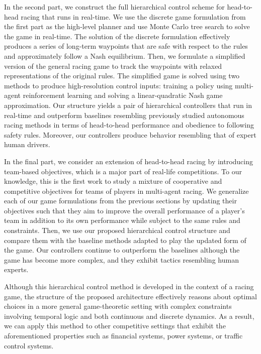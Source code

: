 In the second part, we construct the full hierarchical control scheme for head-to-head racing that runs in real-time. We use the discrete game formulation from the first part as the high-level planner and use Monte Carlo tree search to solve the game in real-time. The solution of the discrete formulation effectively produces a series of long-term waypoints that are safe with respect to the rules and approximately follow a Nash equilibrium. Then, we formulate a simplified version of the general racing game to track the waypoints with relaxed representations of the original rules. The simplified game is solved using two methods to produce high-resolution control inputs: training a policy using multi-agent reinforcement learning and solving a linear-quadratic Nash game approximation. Our structure yields a pair of hierarchical controllers that run in real-time and outperform baselines resembling previously studied autonomous racing methods in terms of head-to-head performance and obedience to following safety rules. Moreover, our controllers produce behavior resembling that of expert human drivers. 

In the final part, we consider an extension of head-to-head racing by introducing team-based objectives, which is a major part of real-life competitions. To our knowledge, this is the first work to study a mixture of cooperative and competitive objectives for teams of players in multi-agent racing. We generalize each of our game formulations from the previous sections by updating their objectives such that they aim to improve the overall performance of a player's team in addition to its own performance while subject to the same rules and constraints. Then, we use our proposed hierarchical control structure and compare them with the baseline methods adapted to play the updated form of the game. Our controllers continue to outperform the baselines although the game has become more complex, and they exhibit tactics resembling human experts.

Although this hierarchical control method is developed in the context of a racing game, the structure of the proposed architecture effectively reasons about optimal choices in a more general game-theoretic setting with complex constraints involving temporal logic and both continuous and discrete dynamics. As a result, we can apply this method to other competitive settings that exhibit the aforementioned properties such as financial systems, power systems, or traffic control systems.

